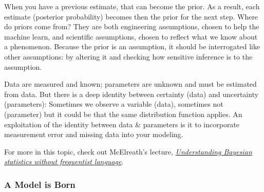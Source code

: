 \documentclass[
  letterpaper,
  DIV=11,
  numbers=noendperiod]{scrreprt}
\begin{document}
When you have a previous estimate, that can become the prior. As a
result, each estimate (posterior probability) becomes then the prior for
the next step. Where do priors come from? They are both engineering
assumptions, chosen to help the machine learn, and scientific
assumptions, chosen to reflect what we know about a phenomenon. Because
the prior is an assumption, it should be interrogated like other
assumptions: by altering it and checking how sensitive inference is to
the assumption.

\begin{tcolorbox}[enhanced jigsaw, colframe=quarto-callout-note-color-frame, colback=white, toprule=.15mm, breakable, arc=.35mm, bottomtitle=1mm, colbacktitle=quarto-callout-note-color!10!white, toptitle=1mm, titlerule=0mm, title=\textcolor{quarto-callout-note-color}{\faInfo}\hspace{0.5em}{Data or Parameters}, leftrule=.75mm, opacityback=0, rightrule=.15mm, opacitybacktitle=0.6, bottomrule=.15mm, left=2mm, coltitle=black]

Data are measured and known; parameters are unknown and must be
estimated from data. But there is a deep identity between certainty
(data) and uncertainty (parameters): Sometimes we observe a variable
(data), sometimes not (parameter) but it could be that the same
distribution function applies. An exploitation of the identity between
data \& parameters is it to incorporate measurement error and missing
data into your modeling.

\begin{tcolorbox}[enhanced jigsaw, colframe=quarto-callout-tip-color-frame, colback=white, toprule=.15mm, breakable, arc=.35mm, bottomtitle=1mm, colbacktitle=quarto-callout-tip-color!10!white, toptitle=1mm, titlerule=0mm, title=\textcolor{quarto-callout-tip-color}{\faLightbulb}\hspace{0.5em}{Tip}, leftrule=.75mm, opacityback=0, rightrule=.15mm, opacitybacktitle=0.6, bottomrule=.15mm, left=2mm, coltitle=black]

For more in this topic, check out McElreath's lecture,
\href{https://youtu.be/yakg94HyWdE}{\emph{Understanding Bayesian
statistics without frequentist language}}.

\end{tcolorbox}

\end{tcolorbox}

\hypertarget{a-model-is-born}{%
\subsubsection{A Model is Born}\label{a-model-is-born}}
\end{document}
